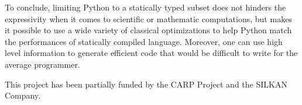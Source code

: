 \documentclass[10pt, onecolumn, preprint]{sigplanconf}
\begin{document}
To conclude, limiting Python to a statically typed subset does not hinders the
expressivity when it comes to scientific or mathematic computations, but makes
it possible to use a wide variety of classical optimizations to help Python
match the performances of statically compiled language. Moreover, one can use
high level information to generate efficient code that would be difficult to write for the average programmer.



\acks

This project has been partially funded by the CARP Project and the SILKAN
Company.




\end{document}
